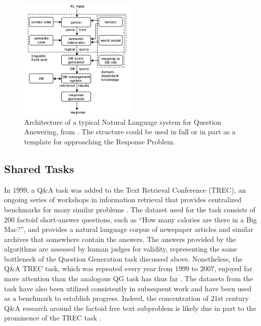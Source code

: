 \begin{figure}[h]
\centerline{%
\includegraphics[width=0.5\textwidth]{figures/NLPQA.png}}%
\caption{Architecture of a typical Natural Language system for Question Answering, from \citep{androutsopoulos1995natural}. The structure could be used in full or in part as a template for approaching the Response Problem.}
\label{fig:NLPQA}
\end{figure}

\subsection{Shared Tasks}

In $1999$, a Q\&A task was added to the Text Retrieval Conference (TREC), an ongoing series of workshops in information retrieval that provides centralized benchmarks for many similar problems \citep{voorhees1999trec}. The dataset used for the task consists of $200$ factoid short-answer questions, such as ``How many calories are there in a Big Mac?'', and provides a natural language corpus of newspaper articles and similar archives that somewhere contain the answers. The answers provided by the algorithms are assessed by human judges for validity, representing the same bottleneck of the Question Generation task discussed above. Nonetheless, the Q\&A TREC task, which was repeated every year from $1999$ to $2007$, enjoyed far more attention than the analogous QG task has thus far \citep{dang2007overview}. The datasets from the task have also been utilized consistently in subsequent work and have been used as a benchmark to establish progress. Indeed, the concentration of $21$st century Q\&A research around the factoid free text subproblem is likely due in part to the prominence of the TREC task \citep{hirschman2001natural}.

